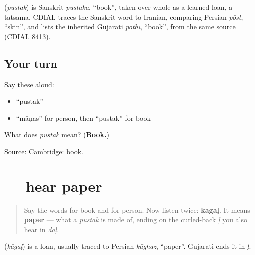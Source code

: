 \begin{cousinweb}
\textbf{} (\emph{pustak}) is Sanskrit \emph{pustaka}, \textquotedblleft{}book\textquotedblright{}, taken over whole as a learned loan, a tatsama. CDIAL traces the Sanskrit word to Iranian, comparing Persian \emph{pōst}, \textquotedblleft{}skin\textquotedblright{}, and lists the inherited Gujarati \emph{pothī}, \textquotedblleft{}book\textquotedblright{}, from the same source (CDIAL 8413).
\end{cousinweb}

\subsection*{Your turn}
Say these aloud:

\begin{itemize}
\raggedright
  \item \textquotedblleft{}pustak\textquotedblright{}
  \item \textquotedblleft{}māṇas\textquotedblright{} for person, then \textquotedblleft{}pustak\textquotedblright{} for book
\end{itemize}

\begin{tcolorbox}[breakable,colback=teal!4,colframe=teal!35!black,title={Before you move on}]
What does \emph{pustak} mean? (\textbf{Book.})

Source: \href{https://dictionary.cambridge.org/dictionary/english-gujarati/book}{Cambridge: book}.
\end{tcolorbox}
\section[\texorpdfstring{\gu{કાગળ} (kāgaḷ)}{કાગળ (kāgaḷ)}]{ — hear paper}

\label{lesson:GU-C30-hear-kaagal}



\begin{quote}
Say the words for book and for person. Now listen twice: \textbf{kāgaḷ}. It means \textbf{paper} — what a \emph{pustak} is made of, ending on the curled-back \emph{ḷ} you also hear in \emph{dāḷ}.
\end{quote}

\begin{cousinweb}
\textbf{} (\emph{kāgaḷ}) is a loan, usually traced to Persian \emph{kāghaz}, \textquotedblleft{}paper\textquotedblright{}. Gujarati ends it in \emph{ḷ}.
\end{cousinweb}

